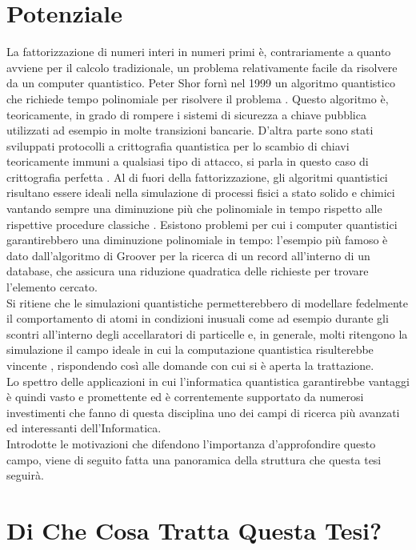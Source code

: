 \documentclass[12pt,a4paper,openright]{report}
\begin{document}
\section{Potenziale}
La fattorizzazione di numeri interi in numeri primi è, contrariamente a quanto avviene per il calcolo tradizionale, un problema relativamente facile da risolvere da un computer quantistico.
Peter Shor fornì nel 1999 un algoritmo quantistico che richiede tempo polinomiale per risolvere il problema \cite{ref25}. Questo algoritmo è, teoricamente, in grado di rompere i sistemi di sicurezza a
chiave pubblica utilizzati ad esempio in molte transizioni bancarie. D'altra parte sono stati sviluppati protocolli a crittografia quantistica per lo scambio di chiavi teoricamente immuni a qualsiasi tipo di 
attacco, si parla in questo caso di crittografia perfetta \cite{ref26}. Al di fuori della fattorizzazione, gli algoritmi quantistici risultano essere ideali nella simulazione di processi fisici a stato solido e chimici
vantando sempre una diminuzione più che polinomiale in tempo rispetto alle rispettive procedure classiche \cite{ref27}. Esistono problemi per cui i computer quantistici garantirebbero una diminuzione polinomiale 
in tempo: l'esempio più famoso è dato dall'algoritmo di Groover \cite{ref28} per la ricerca di un record all'interno di un database, che assicura una riduzione quadratica delle richieste per trovare l'elemento cercato.\\
Si ritiene che le simulazioni quantistiche permetterebbero di modellare fedelmente il comportamento di atomi in condizioni inusuali come ad esempio durante gli scontri all'interno degli accellaratori di particelle \cite{ref29} e,
in generale, molti ritengono la simulazione il campo ideale in cui la computazione quantistica risulterebbe vincente \cite{ref30}, rispondendo così alle domande con cui si è aperta la trattazione.\\
Lo spettro delle applicazioni in cui l'informatica quantistica garantirebbe vantaggi è quindi vasto e promettente ed è correntemente supportato da numerosi investimenti che fanno di questa disciplina uno dei 
campi di ricerca più avanzati ed interessanti dell'Informatica.\\
Introdotte le motivazioni che difendono l'importanza d'approfondire questo campo, viene di seguito fatta una panoramica della struttura che questa tesi seguirà.

\section{Di Che Cosa Tratta Questa Tesi?}
\end{document}
